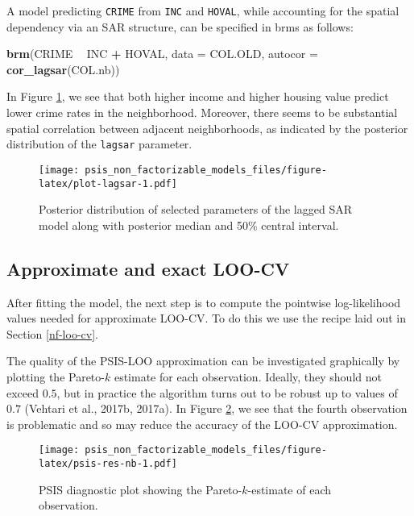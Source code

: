 \documentclass[english,,doc,floatsintext]{apa6}
\newenvironment{Shaded}{\begin{snugshade}}{\end{snugshade}}
\newcommand{\DataTypeTok}[1]{\textcolor[rgb]{0.13,0.29,0.53}{#1}}
\newcommand{\KeywordTok}[1]{\textcolor[rgb]{0.13,0.29,0.53}{\textbf{#1}}}
\newcommand{\NormalTok}[1]{#1}
\newcommand{\OperatorTok}[1]{\textcolor[rgb]{0.81,0.36,0.00}{\textbf{#1}}}
\newcommand{\StringTok}[1]{\textcolor[rgb]{0.31,0.60,0.02}{#1}}
\theoremstyle{definition}
\theoremstyle{definition}
\theoremstyle{definition}
\theoremstyle{remark}
\begin{document}
A model predicting \texttt{CRIME} from \texttt{INC} and \texttt{HOVAL},
while accounting for the spatial dependency via an SAR structure, can be
specified in brms as follows:

\begin{Shaded}
\begin{Highlighting}[]
\KeywordTok{brm}\NormalTok{(CRIME }\OperatorTok{~}\StringTok{ }\NormalTok{INC }\OperatorTok{+}\StringTok{ }\NormalTok{HOVAL, }\DataTypeTok{data =}\NormalTok{ COL.OLD, }\DataTypeTok{autocor =} \KeywordTok{cor_lagsar}\NormalTok{(COL.nb))}
\end{Highlighting}
\end{Shaded}

In Figure \ref{fig:plot-lagsar}, we see that both higher income and
higher housing value predict lower crime rates in the neighborhood.
Moreover, there seems to be substantial spatial correlation between
adjacent neighborhoods, as indicated by the posterior distribution of
the \texttt{lagsar} parameter.

\begin{figure}
\centering
\texttt{[image: psis\_non\_factorizable\_models\_files/figure-latex/plot-lagsar-1.pdf]}
\caption{\label{fig:plot-lagsar}Posterior distribution of selected
parameters of the lagged SAR model along with posterior median and 50\%
central interval.}
\end{figure}

\hypertarget{approximate-and-exact-loo-cv}{%
\subsection{Approximate and exact
LOO-CV}\label{approximate-and-exact-loo-cv}}

After fitting the model, the next step is to compute the pointwise
log-likelihood values needed for approximate LOO-CV. To do this we use
the recipe laid out in Section \ref{nf-loo-cv}.

The quality of the PSIS-LOO approximation can be investigated
graphically by plotting the Pareto-\(k\) estimate for each observation.
Ideally, they should not exceed \(0.5\), but in practice the algorithm
turns out to be robust up to values of \(0.7\) (Vehtari et al., 2017b,
2017a). In Figure \ref{fig:psis-res-nb}, we see that the fourth
observation is problematic and so may reduce the accuracy of the LOO-CV
approximation.

\begin{figure}
\centering
\texttt{[image: psis\_non\_factorizable\_models\_files/figure-latex/psis-res-nb-1.pdf]}
\caption{\label{fig:psis-res-nb}PSIS diagnostic plot showing the
Pareto-\(k\)-estimate of each observation.}
\end{figure}
\end{document}
